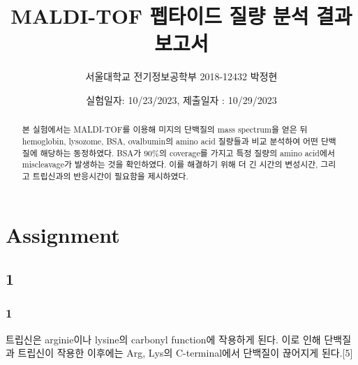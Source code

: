 \documentclass[%
 reprint,
 amsmath,amssymb,
 aps,
]{revtex4-2}
\begin{document}
\title{MALDI-TOF 펩타이드 질량 분석 결과보고서}

\author{서울대학교 전기정보공학부 2018-12432 박정현}
\date{실험일자: 10/23/2023, 제출일자 : 10/29/2023}%

\begin{abstract}
본 실험에서는 MALDI-TOF를 이용해 미지의 단백질의 mass spectrum을 얻은 뒤 hemoglobin, lysozome, BSA, ovalbumin의 amino acid 질량들과 비교 분석하여 어떤 단백질에 해당하는 동정하였다. BSA가 $90\%$의 coverage를 가지고 특정 질량의 amino acid에서 miscleavage가 발생하는 것을 확인하였다. 이를 해결하기 위해 더 긴 시간의 변성시간, 그리고 트립신과의 반응시간이 필요함을 제시하였다.
\end{abstract}

\maketitle


\section{\label{sec:level1}Assignment}
\subsection{\label{sec:level2} 1}
\subsubsection{\label{sec:level3} 1}
트립신은 arginie이나 lysine의 carbonyl function에 작용하게 된다. 이로 인해 단백질과 트립신이 작용한 이후에는 Arg, Lys의 C-terminal에서 단백질이 끊어지게 된다.[5]
\end{document}
